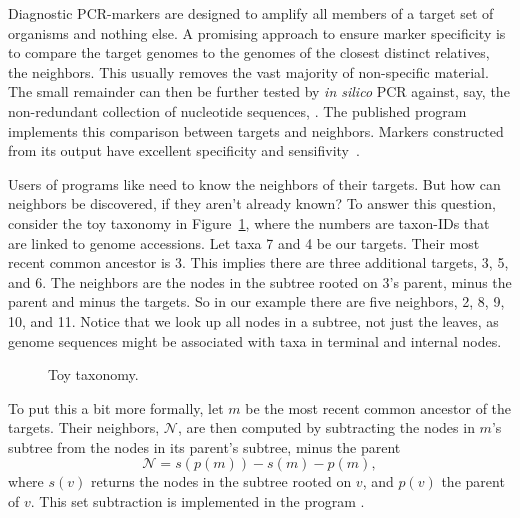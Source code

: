 Diagnostic PCR-markers are designed to amplify all members of a target
set of organisms and nothing else. A promising approach to ensure
marker specificity is to compare the target genomes to the genomes of
the closest distinct relatives, the neighbors. This usually removes
the vast majority of non-specific material. The small remainder can
then be further tested by \emph{in silico} PCR against, say, the
non-redundant collection of nucleotide sequences, . The
published program  implements this comparison between targets
and neighbors. Markers constructed from its output have excellent
specificity and sensifivity~\cite{hau21:fur}.

Users of programs like  need to know the neighbors of their
targets. But how can neighbors be discovered, if they aren't already
known? To answer this question, consider the toy taxonomy in
Figure~\ref{fig:tax}, where the numbers are taxon-IDs that are linked
to genome accessions. Let taxa 7 and 4 be our targets. Their most
recent common ancestor is 3. This implies there are three additional
targets, 3, 5, and 6. The neighbors are the nodes in the subtree
rooted on 3's parent, minus the parent and minus the targets. So in
our example there are five neighbors, 2, 8, 9, 10, and 11. Notice that
we look up all nodes in a subtree, not just the leaves, as genome
sequences might be associated with taxa in terminal and internal
nodes.

\begin{figure}
\begin{center}

\end{center}
\caption{Toy taxonomy.}\label{fig:tax}
\end{figure}

To put this a bit more formally, let $m$ be the most recent common
ancestor of the targets. Their neighbors, $\mathcal{N}$, are then
computed by subtracting the nodes in $m$'s subtree from the nodes in
its parent's subtree, minus the parent
\begin{equation}\label{eq:nei}
\mathcal{N} = s(p(m)) - s(m) - p(m),
\end{equation}
where $s(v)$ returns the nodes in the subtree rooted on $v$, and
$p(v)$ the parent of $v$. This set subtraction is implemented in the
program .

